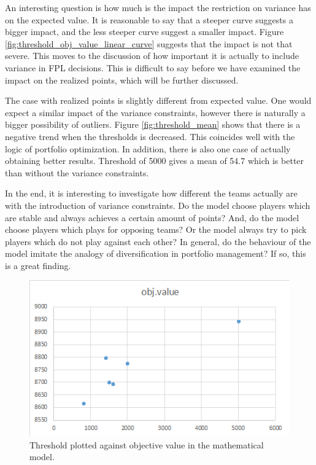 \newpar

An interesting question is how much is the impact the restriction on variance has on the expected value. It is reasonable to say that a steeper curve suggests a bigger impact, and the less steeper curve suggest a smaller impact. Figure \ref{fig:threshold_obj_value_linear_curve} suggests that the impact is not that severe. This moves to the discussion of how important it is actually to include variance in FPL decisions. This is difficult to say before we have examined the impact on the realized points, which will be further discussed. 

\newpar

The case with realized points is slightly different from expected value. One would expect a similar impact of the variance constraints, however there is naturally a bigger possibility of outliers. Figure \ref{fig:threshold_mean} shows that there is a negative trend when the thresholds is decreased. This coincides well with the logic of portfolio optimization. In addition, there is also one case of actually obtaining better results. Threshold of 5000 gives a mean of 54.7 which is better than without the variance constraints. 

\newpar

In the end, it is interesting to investigate how different the teams actually are with the introduction of variance constraints. Do the model choose players which are stable and always achieves a certain amount of points? And, do the model choose players which plays for opposing teams? Or the model always try to pick players which do not play against each other? In general, do the behaviour of the model imitate the analogy of diversification in portfolio management? If so, this is a great finding. 


\begin{figure}[H]
    \centering
    \includegraphics[scale=0.75]{fig/chapter_7/threshold_obj_value.png}
    \caption{Threshold plotted against objective value in the mathematical model.}
\label{fig:threshold_obj_value}    
\end{figure}


